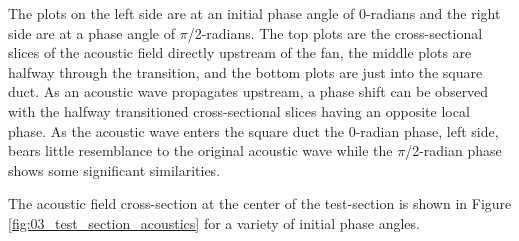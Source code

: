 The plots on the left side are at an initial phase angle of 0-radians and the right side are at a phase angle of $\pi$/2-radians.
The top plots are the cross-sectional slices of the acoustic field directly upstream of the fan, the middle plots are halfway through the transition, and the bottom plots are just into the square duct.
As an acoustic wave propagates upstream, a phase shift can be observed with the halfway transitioned cross-sectional slices having an opposite local phase.
As the acoustic wave enters the square duct the 0-radian phase, left side, bears little resemblance to the original acoustic wave while the $\pi$/2-radian phase shows some significant similarities.

The acoustic field cross-section at the center of the test-section is shown in Figure \ref{fig:03_test_section_acoustics} for a variety of initial phase angles.
